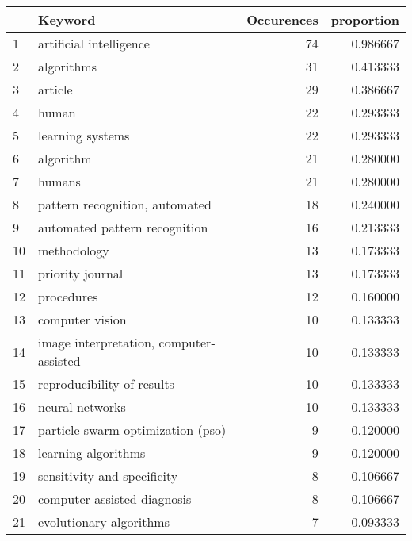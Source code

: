 \begin{tabular}{llrr}
\toprule
{} &                                  Keyword &  Occurences &  proportion \\
\midrule
1  &                  artificial intelligence &          74 &    0.986667 \\
2  &                               algorithms &          31 &    0.413333 \\
3  &                                  article &          29 &    0.386667 \\
4  &                                    human &          22 &    0.293333 \\
5  &                         learning systems &          22 &    0.293333 \\
6  &                                algorithm &          21 &    0.280000 \\
7  &                                   humans &          21 &    0.280000 \\
8  &           pattern recognition, automated &          18 &    0.240000 \\
9  &            automated pattern recognition &          16 &    0.213333 \\
10 &                              methodology &          13 &    0.173333 \\
11 &                         priority journal &          13 &    0.173333 \\
12 &                               procedures &          12 &    0.160000 \\
13 &                          computer vision &          10 &    0.133333 \\
14 &  image interpretation, computer-assisted &          10 &    0.133333 \\
15 &               reproducibility of results &          10 &    0.133333 \\
16 &                          neural networks &          10 &    0.133333 \\
17 &        particle swarm optimization (pso) &           9 &    0.120000 \\
18 &                      learning algorithms &           9 &    0.120000 \\
19 &              sensitivity and specificity &           8 &    0.106667 \\
20 &              computer assisted diagnosis &           8 &    0.106667 \\
21 &                  evolutionary algorithms &           7 &    0.093333 \\

\end{tabular}
